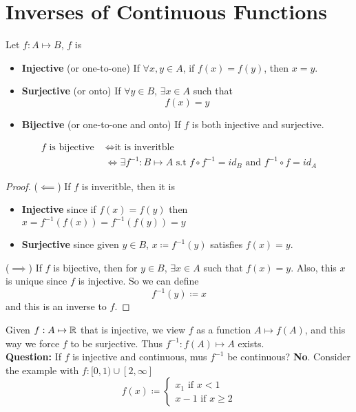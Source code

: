 \documentclass[openany]{report}
\begin{document}
    \section{Inverses of Continuous Functions}
        Let $f: A \mapsto B$, $f$ is  
        \begin{itemize}
            \item \textbf{Injective} (or one-to-one) If $\forall x,y \in A$, if $f(x) = f(y)$, then $x = y$.
            \item \textbf{Surjective} (or onto) If $\forall y \in B$, $\exists x \in A$ such that 
            \[f(x) = y\]
            \item \textbf{Bijective} (or one-to-one and onto) If $f$ is both injective and surjective.
        \end{itemize}
        \begin{align*}
            \text{$f$ is bijective } &\iff \text{it is inveritble }\\
            &\iff \exists f^{-1}:B \mapsto A \text{ s.t } f \circ f^{-1} = id_B \text{ and } f^{-1} \circ f = id_A
        \end{align*}
    \begin{proof}
        ($\impliedby$) If $f$ is inveritble, then it is 
        \begin{itemize}
            \item \textbf{Injective} since if $f(x) = f(y)$ then $x = f^{-1}(f(x)) = f^{-1}(f(y)) = y$
            \item \textbf{Surjective} since given $y \in B$, $x \coloneqq f^{-1}(y)$ satisfies $f(x) = y$. 
        \end{itemize}
        ($\implies$) If $f$ is bijective, then for $y \in B$, $\exists x \in A$ such that $f(x) = y$. Also, this $x$ is unique since $f$ is injective. So we can define 
        \[f^{-1}(y) \coloneqq x\]
        and this is an inverse to $f$.
    \end{proof}
    Given $f: A \mapsto \mathbb{R}$ that is injective, we view $f$ as a function $A \mapsto f(A)$, and this way we force $f$ to be surjective. Thus $f^{-1}: f(A) \mapsto A$ exists.\\[2ex]
    \textbf{Question:} If $f$ is injective and continuous, mus $f^{-1}$ be continuous? \textbf{No}. Consider the example with $f: [0,1) \cup [2, \infty]$
    \[f(x) \coloneqq \begin{cases}
        x_1 \text{ if } x < 1 \\
        x - 1 \text{ if } x \geq 2
    \end{cases}\]
\end{document}
